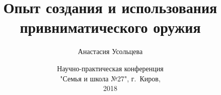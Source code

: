 


\date{Научно-практическая конференция\\"Семья и школа №27", г.~Киров, \\2018}
\author[А.~Усольцева]{Анастасия Усольцева}

\title[Привниматическое оружие]{Опыт создания и использования привниматического оружия}

\newcommand{\myDevice}{БЗДЕНЬК-2}






